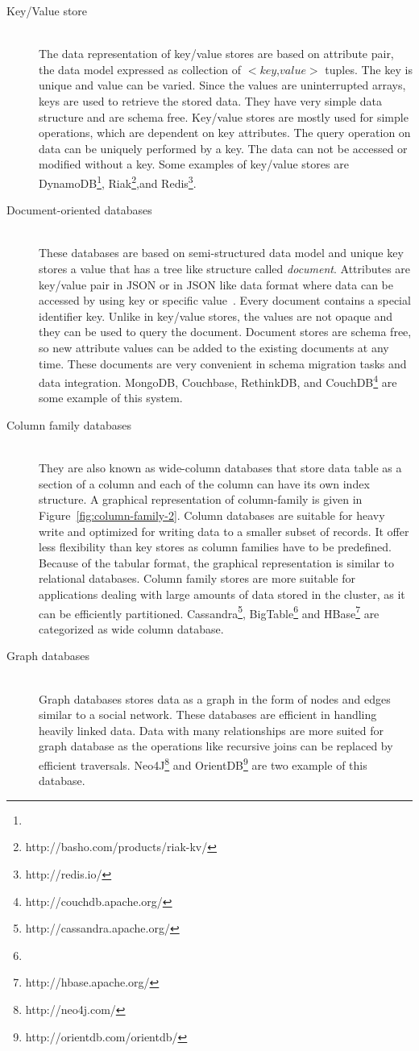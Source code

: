 \documentclass[a4paper,12pt]{book}
\begin{document}
	\begin{description}
		\item[Key/Value store] \hfill \\ 
		The data representation of key/value stores are based on attribute pair, the data model expressed as collection of $<$$key$,$value$$>$ tuples. The key is unique and value can be varied. Since the values are uninterrupted arrays, keys are used to retrieve the stored data. They have very simple data structure and are schema free. Key/value stores are mostly used for simple operations, which are dependent on key attributes. The query operation on data can be uniquely performed by a key. The data can not be accessed or modified without a key. Some examples of key/value stores are DynamoDB\footnote{}, Riak\footnote{http://basho.com/products/riak-kv/},and Redis\footnote{http://redis.io/}.
		\item[Document-oriented databases] \hfill \\ 
	These databases	are based on semi-structured data model and unique key stores a value that has a tree like structure called \textit{document}. Attributes are key/value pair in JSON or in JSON like data format where data can be accessed by using key or specific value~\citep{hecht2011nosql}. Every document contains a special identifier key. Unlike in key/value stores, the values are not opaque and  they can be used to query the document. Document stores are schema free, so new attribute values can be added to the existing documents at any time. These documents are very convenient in schema migration tasks and data integration.  MongoDB, Couchbase, RethinkDB, and CouchDB\footnote{http://couchdb.apache.org/} are some example of this system.
		\item [Column family databases] \hfill \\
		They are also known as wide-column databases that store data table as a section of a column and each of the column can have  its own index structure. A graphical representation of column-family is given in  Figure~\ref{fig:column-family-2}. Column databases are suitable for heavy write and optimized for writing data to a smaller subset of records. It offer less flexibility than key stores as column families have to be predefined. Because of the tabular format, the graphical representation is similar to relational databases. Column family stores are more suitable for applications dealing with large amounts of data stored in the cluster, as it can be efficiently partitioned.  Cassandra\footnote{http://cassandra.apache.org/}, BigTable\footnote{} and HBase\footnote{http://hbase.apache.org/} are categorized as wide column database.
		\item[Graph databases] \hfill \\
		Graph databases stores data as a  graph in the form of nodes and edges similar to a social network. These databases are efficient in handling heavily linked data. Data with many relationships are more suited for graph database as the operations like recursive joins can be replaced by efficient traversals. Neo4J\footnote{http://neo4j.com/} and OrientDB\footnote{http://orientdb.com/orientdb/} are two example of this database.

\end{description}
	
\end{document}
